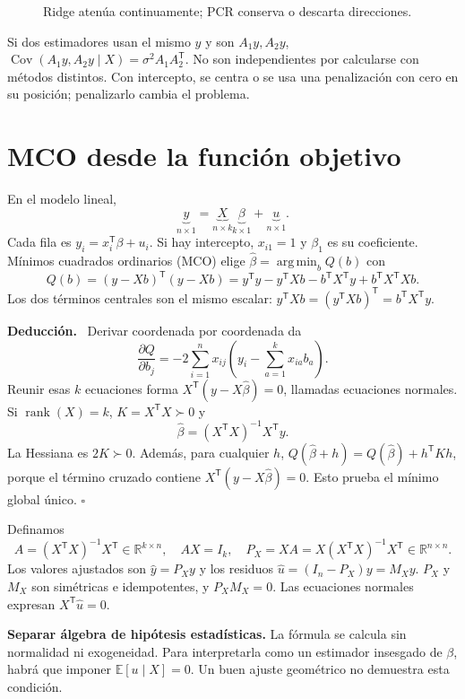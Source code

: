 \documentclass[11pt,a4paper]{article}
\newcommand{\R}{\mathbb R}
\newcommand{\E}{\mathbb E}
\newcommand{\T}{^{\mathsf T}}
\DeclareMathOperator{\Cov}{Cov}
\DeclareMathOperator{\rank}{rank}
\DeclareMathOperator*{\argmin}{arg\,min}
\newcommand{\topic}[2]{\clearpage\section{#1}\label{#2}}
\newenvironment{deduccion}{\par\textbf{Deducción.}\ }{\hfill$\square$\par}
\theoremstyle{definition}\newtheorem{definicion}[teorema]{Definición}
\begin{document}
\begin{figure}[H]\centering
{}
\caption{Ridge atenúa continuamente; PCR conserva o descarta direcciones.}
\end{figure}
Si dos estimadores usan el mismo $y$ y son $A_1y,A_2y$,
$\Cov(A_1y,A_2y\mid X)=\sigma^2A_1A_2\T$.
No son independientes por calcularse con métodos distintos.
Con intercepto, se centra o se usa una penalización con cero en su posición;
penalizarlo cambia el problema.

\topic{MCO desde la función objetivo}{s33}
En el modelo lineal,
\[
\underbrace y_{n\times1}
=\underbrace X_{n\times k}\underbrace\beta_{k\times1}
+\underbrace u_{n\times1}.
\]
Cada fila es $y_i=x_i\T\beta+u_i$.
Si hay intercepto, $x_{i1}=1$ y $\beta_1$ es su coeficiente.
Mínimos cuadrados ordinarios (MCO) elige
$\widehat\beta=\argmin_b Q(b)$ con
\[
Q(b)=(y-Xb)\T(y-Xb)
=y\T y-y\T Xb-b\T X\T y+b\T X\T Xb.
\]
Los dos términos centrales son el mismo escalar:
$y\T Xb=(y\T Xb)\T=b\T X\T y$.

\begin{deduccion}
Derivar coordenada por coordenada da
\[
\frac{\partial Q}{\partial b_j}
=-2\sum_{i=1}^nx_{ij}\left(y_i-\sum_{a=1}^kx_{ia}b_a\right).
\]
Reunir esas $k$ ecuaciones forma
$X\T(y-X\widehat\beta)=0$, llamadas ecuaciones normales.
Si $\rank(X)=k$, $K=X\T X\succ0$ y
\[
\boxed{\widehat\beta=(X\T X)^{-1}X\T y}.
\]
La Hessiana es $2K\succ0$.
Además, para cualquier $h$,
$Q(\widehat\beta+h)=Q(\widehat\beta)+h\T Kh$,
porque el término cruzado contiene $X\T(y-X\widehat\beta)=0$.
Esto prueba el mínimo global único.
\end{deduccion}
Definamos
\[
A=(X\T X)^{-1}X\T\in\R^{k\times n},\quad AX=I_k,
\quad P_X=XA=X(X\T X)^{-1}X\T\in\R^{n\times n}.
\]
Los valores ajustados son $\widehat y=P_Xy$ y los residuos
$\widehat u=(I_n-P_X)y=M_Xy$.
$P_X$ y $M_X$ son simétricas e idempotentes, y
$P_XM_X=0$. Las ecuaciones normales expresan $X\T\widehat u=0$.

\textbf{Separar álgebra de hipótesis estadísticas.}
La fórmula se calcula sin normalidad ni exogeneidad.
Para interpretarla como un estimador insesgado de $\beta$, habrá que
imponer $\E[u\mid X]=0$.
Un buen ajuste geométrico no demuestra esta condición.
\end{document}
